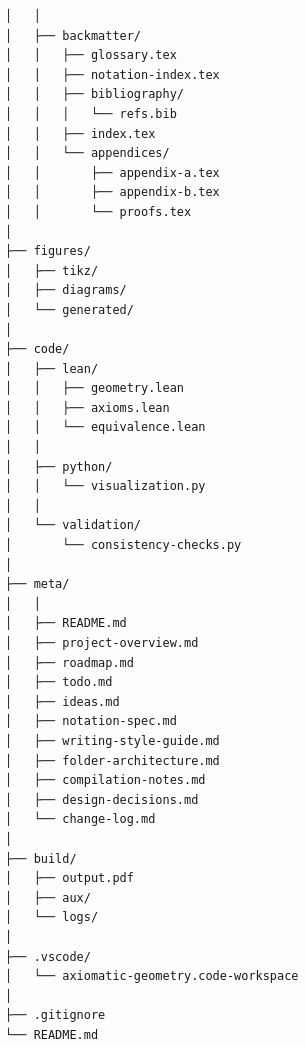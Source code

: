 \documentclass{book}
\begin{document}
\begin{verbatim}
│   │
│   ├── backmatter/
│   │   ├── glossary.tex
│   │   ├── notation-index.tex
│   │   ├── bibliography/
│   │   │   └── refs.bib
│   │   ├── index.tex
│   │   └── appendices/
│   │       ├── appendix-a.tex
│   │       ├── appendix-b.tex
│   │       └── proofs.tex
│
├── figures/
│   ├── tikz/
│   ├── diagrams/
│   └── generated/
│
├── code/
│   ├── lean/
│   │   ├── geometry.lean
│   │   ├── axioms.lean
│   │   └── equivalence.lean
│   │
│   ├── python/
│   │   └── visualization.py
│   │
│   └── validation/
│       └── consistency-checks.py
│
├── meta/
│   │
│   ├── README.md
│   ├── project-overview.md
│   ├── roadmap.md
│   ├── todo.md
│   ├── ideas.md
│   ├── notation-spec.md
│   ├── writing-style-guide.md
│   ├── folder-architecture.md
│   ├── compilation-notes.md
│   ├── design-decisions.md
│   └── change-log.md
│
├── build/
│   ├── output.pdf
│   ├── aux/
│   └── logs/
│
├── .vscode/
│   └── axiomatic-geometry.code-workspace
│
├── .gitignore
└── README.md


\end{verbatim}
\end{document}
